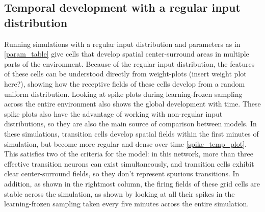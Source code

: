 \documentclass{article}
\begin{document}
    \subsection{Temporal development with a regular input distribution}
    Running simulations with a regular input distribution and parameters as in \ref{param_table} give cells that develop spatial center-surround areas in multiple parts of the environment. Because of the regular input distribution, the features of these cells can be understood directly from weight-plots (insert weight plot here?), showing how the receptive fields of these cells develop from a random uniform distribution.
    Looking at spike plots during learning-frozen sampling across the entire environment also shows the global development with time. These spike plots also have the advantage of working with non-regular input distributions, so they are also the main source of comparison between models. In these simulations, transition cells develop spatial fields within the first minutes of simulation, but become more regular and dense over time \ref{spike_temp_plot}. This satisfies two of the criteria for the model: in this network, more than three effective transition neurons can exist simultaneously, and transition cells exhibit clear center-surround fields, so they don't represent spurious transitions. In addition, as shown in the rightmost column, the firing fields of these grid cells are stable across the simulation, as shown by looking at all their spikes in the learning-frozen sampling taken every five minutes across the entire simulation.
\end{document}
